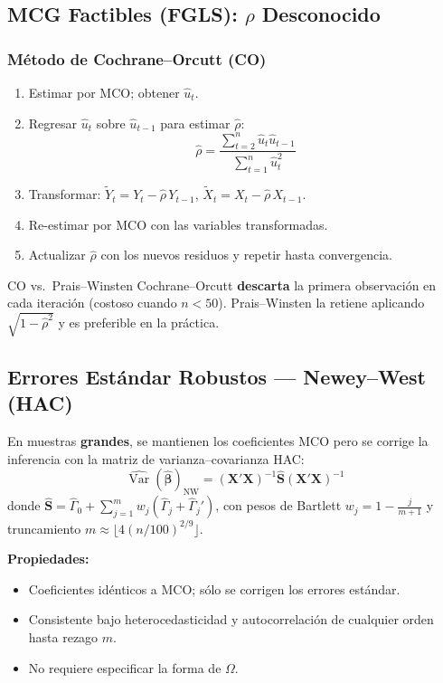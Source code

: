 \documentclass[11pt, letterpaper]{article}
\begin{document}
\subsection{MCG Factibles (FGLS): $\rho$ Desconocido}

\subsubsection{M\'etodo de Cochrane--Orcutt (CO)}
\begin{enumerate}
  \item Estimar por MCO; obtener $\hat{u}_t$.
  \item Regresar $\hat{u}_t$ sobre $\hat{u}_{t-1}$ para estimar $\hat\rho$:
  \[
    \hat\rho = \frac{\sum_{t=2}^n \hat{u}_t\hat{u}_{t-1}}{\sum_{t=1}^n \hat{u}_t^2}
  \]
  \item Transformar: $\tilde{Y}_t = Y_t - \hat\rho\,Y_{t-1}$, $\tilde{X}_t = X_t - \hat\rho\,X_{t-1}$.
  \item Re-estimar por MCO con las variables transformadas.
  \item Actualizar $\hat\rho$ con los nuevos residuos y repetir hasta convergencia.
\end{enumerate}

\begin{nota}{CO vs.\ Prais--Winsten}
Cochrane--Orcutt \textbf{descarta} la primera observaci\'on en cada iteraci\'on
(costoso cuando $n<50$). Prais--Winsten la retiene aplicando $\sqrt{1-\hat\rho^2}$
y es preferible en la pr\'actica.
\end{nota}

\subsection{Errores Est\'andar Robustos --- Newey--West (HAC)}

En muestras \textbf{grandes}, se mantienen los coeficientes MCO pero
se corrige la inferencia con la matriz de varianza--covarianza HAC:
\[
  \widehat{\operatorname{Var}}(\hat{\bm\beta})_{\text{NW}}
  = (\mathbf{X}'\mathbf{X})^{-1}
    \hat{\mathbf{S}}
    (\mathbf{X}'\mathbf{X})^{-1}
\]
donde $\hat{\mathbf{S}} = \hat\Gamma_0 +
\sum_{j=1}^{m} w_j(\hat\Gamma_j+\hat\Gamma_j')$,
con pesos de Bartlett $w_j = 1 - \frac{j}{m+1}$
y truncamiento $m \approx \lfloor 4(n/100)^{2/9}\rfloor$.

\medskip\noindent\textbf{Propiedades:}
\begin{itemize}
  \item Coeficientes id\'enticos a MCO; s\'olo se corrigen los errores est\'andar.
  \item Consistente bajo heterocedasticidad y autocorrelaci\'on de cualquier
    orden hasta rezago $m$.
  \item No requiere especificar la forma de $\Omega$.
\end{itemize}
\end{document}
